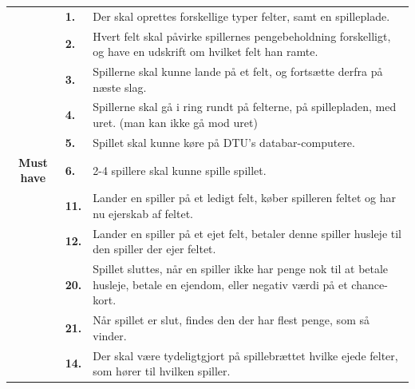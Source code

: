 \begin{center}
    \begin{tabular}{ || c | l | p{11.5cm} ||}
        \hline
        \hline
    &        
    \textbf{1.}
    &
    Der skal oprettes forskellige typer felter, samt en spilleplade. 
    \\

    \cline{2-3}
    &
    \textbf{2.}
    & 
    Hvert felt skal påvirke spillernes pengebeholdning forskelligt, og have en udskrift om hvilket felt han ramte. 
    \\
    
    \cline{2-3}
    &
    \textbf{3.}
    &
    Spillerne skal kunne lande på et felt, og fortsætte derfra på næste slag.
    \\

    \cline{2-3}
    &
    \textbf{4.}
    &
    Spillerne skal gå i ring rundt på felterne, på spillepladen, med uret. (man kan ikke gå mod uret)
    \\

    \cline{2-3}
    &
    \textbf{5.} 
    &
    Spillet skal kunne køre på DTU’s databar-computere.
    \\
    
    \cline{2-3}
    \textbf{Must have}
    &
    \textbf{6.}
    &
    2-4 spillere skal kunne spille spillet.
    \\
    
    \cline{2-3}
    &
    \textbf{11.}
    &
    Lander en spiller på et ledigt felt, køber spilleren feltet og 
    har nu ejerskab af feltet.
    \\

    \cline{2-3}
    &
    \textbf{12.}
    &
    Lander en spiller på et ejet felt, betaler denne spiller husleje til den spiller der ejer feltet.
    \\

    \cline{2-3}
    &
    \textbf{20.}
    &
    Spillet sluttes, når en spiller ikke har penge nok til at betale husleje, betale en ejendom, eller negativ værdi på et chance-kort.
    \\

    \cline{2-3}
    &
    \textbf{21.}
    &
    Når spillet er slut, findes den der har flest penge, som så vinder.
    \\
    
    \hline
    \hline
     &
     \textbf{14.}
     &
     Der skal være tydeligtgjort på spillebrættet hvilke ejede felter, som hører til hvilken spiller.
     \\


\end{tabular}
\end{center}
